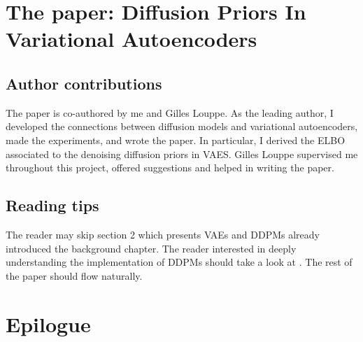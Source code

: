 \section{The paper: Diffusion Priors In Variational Autoencoders}

\subsection{Author contributions}
The paper is co-authored by me and Gilles Louppe. As the leading author, I developed the connections between diffusion models and variational autoencoders, made the experiments, and wrote the paper. In particular, I derived the ELBO associated to the denoising diffusion priors in VAES. Gilles Louppe supervised me throughout this project, offered suggestions and helped in writing the paper.

\subsection{Reading tips}
The reader may skip section 2 which presents VAEs and DDPMs already introduced the background chapter. The reader interested in deeply understanding the implementation of DDPMs should take a look at \citet{ho_denoising_2020}. The rest of the paper should flow naturally.




\section{Epilogue}
